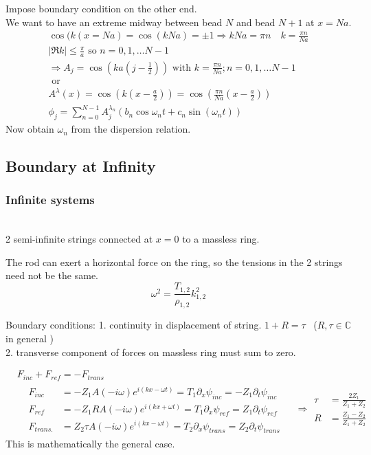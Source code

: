 \documentclass[twoside, 10pt]{amsart}
\begin{document}
Impose boundary condition on the other end.  \\
\quad We want to have an extreme midway between bead $N$ and bead $N+1$ at $x=Na$.  
\[
\begin{gathered}
  \cos{ (k(x=Na) } = \cos{ (kNa) } = \pm 1 \Longrightarrow kNa = \pi n \quad k = \frac{ \pi n}{Na}  \\
    | \Re k | \leq \frac{\pi}{a} \text{ so } n=0,1,\dots N-1 \\
    \Longrightarrow A_j = \cos{ (ka (j-\frac{1}{2} ) )} \text{ with } k=\frac{ \pi n}{ Na}; n=0,1,\dots N-1  \\
    \text{ or } \\
    A^{\lambda}(x) = \cos{ (k (x-\frac{a}{2} ) ) } = \cos{ (\frac{\pi n}{ Na} (x - \frac{a}{2} ) ) }  \\
    \phi_j = \sum_{n=0}^{N-1} A_j^{\lambda_n} (b_n \cos{ \omega_n t } + c_n \sin{ (\omega_n t )} ) 
\end{gathered}
\]
Now obtain $\omega_n$ from the dispersion relation.

\subsection{ Boundary at Infinity }

\subsubsection{ Infinite systems }  \quad \\
2 semi-infinite strings connected at $x=0$ to a massless ring.  

The rod can exert a horizontal force on the ring, so the tensions in the 2 strings need not be the same.  
\[
\omega^2 = \frac{T_{1,2}}{\rho_{1,2}} k_{1,2}^2 
\]

Boundary conditions: 1. continuity in displacement of string.  $1+R = \tau$ \quad \, ($ R, \tau \in \mathbb{C}$ in general ) \\
2. transverse component of forces on massless ring must sum to zero.  

\[
\begin{aligned}
  & F_{inc} + F_{ref} = - F_{trans} \\
  & \begin{aligned}
    & F_{inc} & = -Z_1 A(-i\omega )e^{i(kx - \omega t) } = T_1 \partial_x \psi_{inc} = -Z_1 \partial_t \psi_{inc} \\
    & F_{ref} & = -Z_1 R A(-i\omega )e^{i(kx + \omega t) } = T_1 \partial_x \psi_{ref} = Z_1 \partial_t \psi_{ref} \\
    & F_{trans.} & = Z_2 \tau A(-i\omega )e^{i(kx - \omega t) } = T_2 \partial_x \psi_{trans} = Z_2 \partial_t \psi_{trans} \end{aligned}  \quad \, \Longrightarrow
\begin{aligned}
  \tau & = \frac{ 2 Z_1 }{ Z_1 + Z_2 } \\
  R & = \frac{Z_1 - Z_2}{ Z_1 + Z_2 }
\end{aligned}
\end{aligned}
\]
This is mathematically the general case.  
\end{document}
